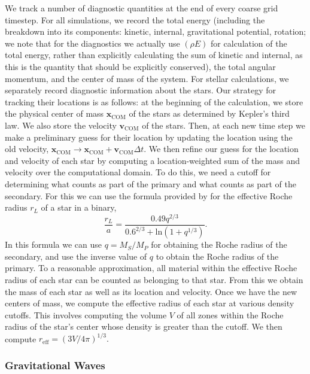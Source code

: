 \documentclass[iop]{../emulateapj}
\begin{document}
We track a number of diagnostic quantities at the end of every coarse grid timestep. 
For all simulations, we record the total energy (including the breakdown into
its components: kinetic, internal, gravitational potential, rotation; we note
that for the diagnostics we actually use $(\rho E)$ for calculation of the total energy,
rather than explicitly calculating the sum of kinetic and internal, as this is
the quantity that should be explicitly conserved), 
the total angular momentum, and the center of mass of the system. 
For stellar calculations, we separately record diagnostic 
information about the stars. Our strategy for tracking their 
locations is as follows: at the beginning of the calculation, we store the 
physical center of mass $\mathbf{x}_{\text{COM}}$ of the stars as determined 
by Kepler's third law. We also store the velocity $\mathbf{v}_{\text{COM}}$ 
of the stars. Then, at each new time step we make a preliminary guess for their 
location by updating the location using the old velocity, 
$\mathbf{x}_{\text{COM}} \rightarrow \mathbf{x}_{\text{COM}} + \mathbf{v}_{\text{COM}} \Delta t$.
We then refine our guess for the location and velocity of each star by computing a
location-weighted sum of the mass and velocity over the computational domain. 
To do this, we need a cutoff for determining what counts as part of the primary 
and what counts as part of the secondary. For this we can use the formula provided by 
\citet{eggleton:1983} for the effective Roche radius $r_L$ of a star in a binary,
\begin{equation}
  \frac{r_L}{a} = \frac{0.49 q^{2/3}}{0.6^{2/3} + \text{ln}(1 + q^{1/3})}.
\end{equation}
In this formula we can use $q = M_S / M_P$ for obtaining the Roche radius of the secondary,
and use the inverse value of $q$ to obtain the Roche radius of the primary.
To a reasonable approximation, all material within the effective Roche radius
of each star can be counted as belonging to that star. From this we obtain the mass
of each star as well as its location and velocity. Once we have the new centers of mass,
we compute the effective radius of each star at various density cutoffs. This involves 
computing the volume $V$ of all zones within the Roche radius of the star's center 
whose density is greater than the cutoff. We then compute $r_{\text{eff}} = (3V/4\pi)^{1/3}.$

\subsubsection{Gravitational Waves}
\label{sec:grvatational_waves}
\end{document}
